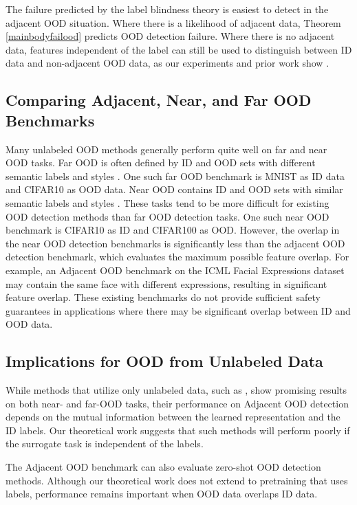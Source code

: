The failure predicted by the label blindness theory is easiest to detect in the adjacent OOD situation. Where there is a likelihood of adjacent data, Theorem \ref{mainbodyfailood} predicts OOD detection failure. Where there is no adjacent data, features independent of the label can still be used to distinguish between ID data and non-adjacent OOD data, as our experiments and prior work show \citep{sehwag2021ssd, hendrycks2019using, liu2023unsupervised}.

\subsection{Comparing Adjacent, Near, and Far OOD Benchmarks}

Many unlabeled OOD methods generally perform quite well on far and near OOD tasks. Far OOD is often defined by ID and OOD sets with different semantic labels and styles \citep{fang2022out}. One such far OOD benchmark is MNIST as ID data and CIFAR10 as OOD data. Near OOD contains ID and OOD sets with similar semantic labels and styles \citep{fang2022out}. These tasks tend to be more difficult for existing OOD detection methods than far OOD detection tasks. One such near OOD benchmark is CIFAR10 as ID and CIFAR100 as OOD. However, the overlap in the near OOD detection benchmarks is significantly less than the adjacent OOD detection benchmark, which evaluates the maximum possible feature overlap. For example, an Adjacent OOD benchmark on the ICML Facial Expressions dataset may contain the same face with different expressions, resulting in significant feature overlap. These existing benchmarks do not provide sufficient safety guarantees in applications where there may be significant overlap between ID and OOD data.

\subsection{Implications for OOD from Unlabeled Data}

While methods that utilize only unlabeled data, such as \citet{sehwag2021ssd, liu2023unsupervised, guille2024cadet}, show promising results on both near- and far-OOD tasks, their performance on Adjacent OOD detection depends on the mutual information between the learned representation and the ID labels. Our theoretical work suggests that such methods will perform poorly if the surrogate task is independent of the labels.

The Adjacent OOD benchmark can also evaluate zero-shot OOD detection methods. Although our theoretical work does not extend to pretraining that uses labels, performance remains important when OOD data overlaps ID data.

